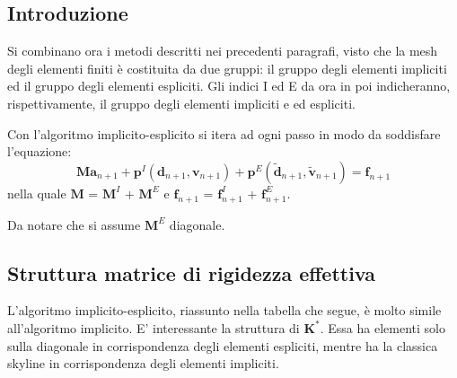 \subsection{Introduzione}
Si combinano ora i metodi descritti nei precedenti paragrafi, visto che la mesh degli elementi finiti è costituita da due gruppi: il gruppo degli elementi impliciti ed il gruppo degli elementi espliciti. Gli indici I ed E da ora in poi indicheranno, rispettivamente, il gruppo degli elementi impliciti e ed espliciti.

Con l'algoritmo implicito-esplicito si itera ad ogni passo in modo da soddisfare l'equazione:
\begin{equation}
	\boldsymbol{M a}_{n+1} + \boldsymbol{p}^I(\boldsymbol{d}_{n+1}, \boldsymbol{v}_{n+1}) + \boldsymbol{p}^E(\tilde{\boldsymbol{d}}_{n+1}, \tilde{\boldsymbol{v}}_{n+1}) = \boldsymbol{f}_{n+1}
\end{equation}
nella quale $\boldsymbol{M}$ = $\boldsymbol{M}^I$ + $\boldsymbol{M}^E$ e $\boldsymbol{f}_{n+1}$ = $\boldsymbol{f}_{n+1}^I$ + $\boldsymbol{f}_{n+1}^E$. 

Da notare che si assume $\boldsymbol{M}^E$ diagonale.

\subsection{Struttura matrice di rigidezza effettiva}
L'algoritmo implicito-esplicito, riassunto nella tabella che segue, è molto simile all'algoritmo implicito. E' interessante la struttura di $\boldsymbol{K}^*$. Essa ha elementi solo sulla diagonale in corrispondenza degli elementi espliciti, mentre ha la classica skyline in corrispondenza degli elementi impliciti. 

